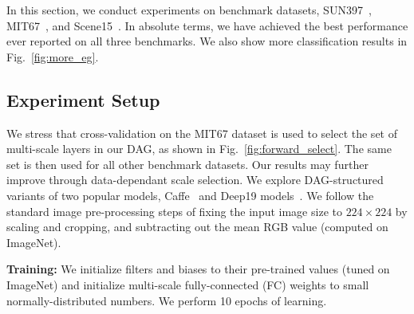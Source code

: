 \documentclass[10pt,twocolumn,letterpaper]{article}
\begin{document}
In this section, we conduct experiments on benchmark datasets, SUN397~\cite{SUN397}, MIT67~\cite{MIT67}, and Scene15~\cite{Scene15}. In absolute terms, we have achieved the best performance ever reported on all three benchmarks. We also show more classification results in Fig.~\ref{fig:more_eg}. 

\subsection{Experiment Setup}
We stress that cross-validation on the MIT67 dataset is used to select the set of multi-scale layers in our DAG, as shown in Fig.~\ref{fig:forward_select}. The same set is then used for all other benchmark datasets. Our results may further improve through data-dependant scale selection. We explore DAG-structured variants of two popular models, Caffe~\cite{Caffe} and Deep19 models~\cite{veryDeep}. We follow the standard image pre-processing steps of fixing the input image size to $224\times 224$ by scaling and cropping, and subtracting out the mean RGB value (computed on ImageNet). 

{\bf Training:} We initialize filters and biases to their pre-trained values (tuned on ImageNet) and initialize multi-scale fully-connected (FC) weights to small normally-distributed numbers. We perform 10 epochs of learning.
\end{document}
